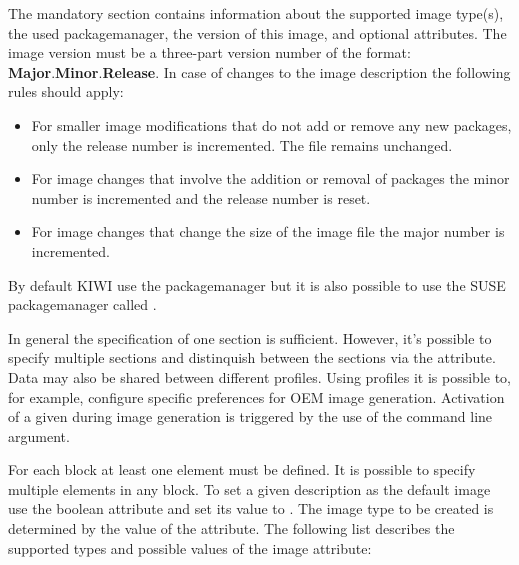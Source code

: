 The mandatory  section contains information about the supported
image type(s), the used packagemanager, the version of this image, and
optional attributes. The image version must be a three-part version number of
the format: \textbf{Major}.\textbf{Minor}.\textbf{Release}. In case of
changes to the image description the following rules should apply:

\begin{itemize}
\item For smaller image modifications that do not add or remove any
      new packages, only the release number is incremented.
      The  file remains unchanged.
\item For image changes that involve the addition or removal of packages
      the minor number is incremented and the release number is reset.
\item For image changes that change the size of the image file
      the major number is incremented.
\end{itemize}

By default KIWI use the  packagemanager but it is also possible
to use the SUSE packagemanager called . 

In general the specification of one  section is sufficient.
However, it's possible to specify multiple  sections and
distinquish between the sections via the  attribute. Data
may also be shared between different profiles. Using profiles it is possible
to, for example, configure specific preferences for OEM image generation. 
Activation of a given  during image generation is triggered by
the use of the  command line argument.

For each  block at least one  element must be
defined. It is possible to specify multiple  elements in any 
 block. To set a given  description as the default image
use the boolean attribute  and set its value to .
The image type to be created is determined by the value of the 
attribute. The following list describes the supported types and possible
values of the image attribute:

